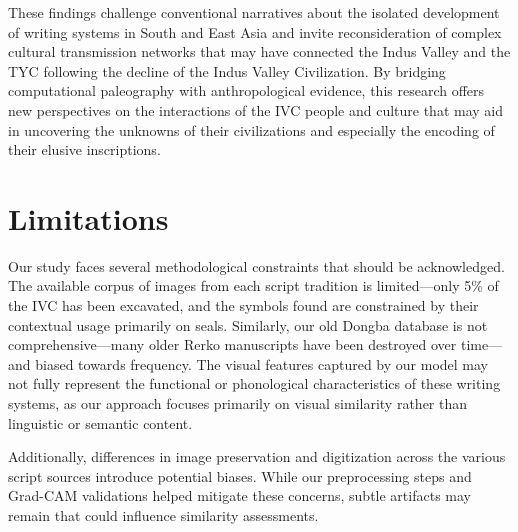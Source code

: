 \documentclass[11pt,a4paper,oneside]{report}
\begin{document}
These findings challenge conventional narratives about the isolated development of writing systems in South and East Asia and invite reconsideration of complex cultural transmission networks that may have connected the Indus Valley and the TYC following the decline of the Indus Valley Civilization. By bridging computational paleography with anthropological evidence, this research offers new perspectives on the interactions of the IVC people and culture that may aid in uncovering the unknowns of their civilizations and especially the encoding of their elusive inscriptions.

\section{Limitations}
\noindent\hspace{1cm}
Our study faces several methodological constraints that should be acknowledged. The available corpus of images from each script tradition is limited—only 5\% of the IVC has been excavated, and the symbols found are constrained by their contextual usage primarily on seals. Similarly, our old Dongba database is not comprehensive—many older Rerko manuscripts have been destroyed over time—and biased towards frequency. The visual features captured by our model may not fully represent the functional or phonological characteristics of these writing systems, as our approach focuses primarily on visual similarity rather than linguistic or semantic content.

Additionally, differences in image preservation and digitization across the various script sources introduce potential biases. While our preprocessing steps and Grad-CAM validations helped mitigate these concerns, subtle artifacts may remain that could influence similarity assessments. 
\end{document}
